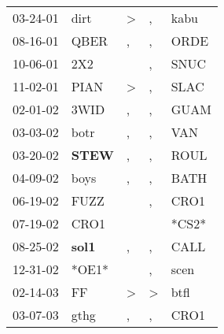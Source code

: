 \begin{supertabular}{p{0.07\textwidth}p{0.06\textwidth}p{0.02\textwidth}p{0.02\textwidth}p{0.06\textwidth}}
          03-24-01\textsuperscript{} &           dirt\textsuperscript{} &     \textgreater &                , &           kabu\textsuperscript{} \\
          08-16-01\textsuperscript{} &           QBER\textsuperscript{} &                , &                , &           ORDE\textsuperscript{} \\
          10-06-01\textsuperscript{} &            2X2\textsuperscript{} &                  &                , &           SNUC\textsuperscript{} \\
          11-02-01\textsuperscript{} &           PIAN\textsuperscript{} &     \textgreater &                , &           SLAC\textsuperscript{} \\
          02-01-02\textsuperscript{} &           3WID\textsuperscript{} &                , &                , &           GUAM\textsuperscript{} \\
          03-03-02\textsuperscript{} &           botr\textsuperscript{} &                , &                , &            VAN\textsuperscript{} \\
          03-20-02\textsuperscript{} &  \textbf{STEW\textsuperscript{}} &                , &                , &           ROUL\textsuperscript{} \\
          04-09-02\textsuperscript{} &           boys\textsuperscript{} &                , &                , &           BATH\textsuperscript{} \\
          06-19-02\textsuperscript{} &           FUZZ\textsuperscript{} &                  &                , &           CRO1\textsuperscript{} \\
          07-19-02\textsuperscript{} &           CRO1\textsuperscript{} &                  &                  &                            *CS2* \\
          08-25-02\textsuperscript{} &  \textbf{sol1\textsuperscript{}} &                , &                , &           CALL\textsuperscript{} \\
          12-31-02\textsuperscript{} &                            *OE1* &                  &                , &           scen\textsuperscript{} \\
          02-14-03\textsuperscript{} &             FF\textsuperscript{} &     \textgreater &     \textgreater &           btfl\textsuperscript{} \\
          03-07-03\textsuperscript{} &           gthg\textsuperscript{} &                , &                , &           CRO1\textsuperscript{} \\

\end{supertabular}
